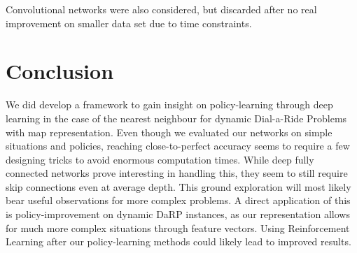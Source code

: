 \documentclass{article}
\begin{document}
Convolutional networks were also considered, but discarded after no real improvement on smaller data set due to time constraints.




\section{Conclusion}
We did develop a framework to gain insight on policy-learning through deep learning in the case of the nearest neighbour for dynamic Dial-a-Ride Problems with map representation.
Even though we evaluated our networks on simple situations and policies,
reaching close-to-perfect accuracy seems to require a few designing tricks to avoid enormous computation times.
While deep fully connected networks prove interesting in handling this,
they seem to still require skip connections even at average depth.
This ground exploration will most likely bear useful observations for more complex problems.
A direct application of this is policy-improvement on dynamic DaRP instances, as our representation allows for much more complex situations through feature vectors.
Using Reinforcement Learning after our policy-learning methods could likely lead to improved results.








\end{document}
